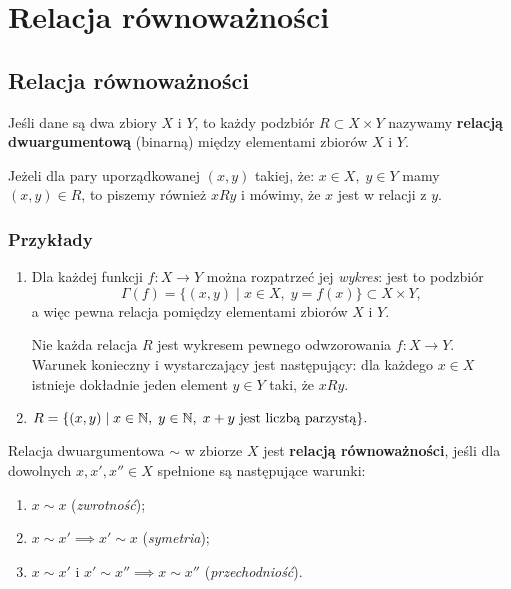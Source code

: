 \chapter{Relacja równoważności}
	\section{Relacja równoważności}
	\begin{df}
		Jeśli dane są dwa zbiory $X$ i $Y$, to każdy podzbiór $R \subset X \times Y $ nazywamy \textbf{relacją dwuargumentową} (binarną) między elementami zbiorów $X$ i $Y$.
	\end{df}
	Jeżeli dla pary uporządkowanej $(x,y)$ takiej, że: $x \in X, \; y \in Y$ mamy $(x,y) \in R$, to piszemy również $ x R y$ i mówimy, że $x$ jest w relacji z $y$.

	\subsection*{Przykłady}
	\begin{enumerate}
		\item Dla każdej funkcji $f: X \rightarrow Y$ można rozpatrzeć jej \textit{wykres}: jest to podzbiór
		\begin{equation}
			\Gamma(f) = \{ (x,y) \; | \; x \in  X, \; y = f(x) \} \subset X \times Y,
		\end{equation}
		a więc pewna relacja pomiędzy elementami zbiorów $X$ i $Y$. 
		\begin{uwg}
			Nie każda relacja $R$ jest wykresem pewnego odwzorowania $f: X \rightarrow Y$. \\Warunek konieczny i wystarczający jest następujący: dla każdego $x \in X$ istnieje dokładnie jeden element $y \in Y$ taki, że $xRy$.  
		\end{uwg}
		\item 
			$
				 R = \{ (x,y) \; | \; x \in  \mathbb{N}, \; y \in \mathbb{N}, \; x + y \textnormal{ jest liczbą parzystą} \}.
			$
	\end{enumerate}
	\begin{df} Relacja dwuargumentowa $\sim$ w zbiorze $X$ jest \textbf{relacją równoważności}, jeśli dla dowolnych $x, x', x'' \in X$ spełnione są następujące warunki:
		\begin{enumerate}
			\item $x \sim x$ (\textit{zwrotność});
			\item $x \sim x' \implies x' \sim x$ (\textit{symetria});
			\item $x \sim x'$ i $x' \sim x'' \implies x \sim x''$ (\textit{przechodniość}).
		\end{enumerate}
	\end{df}
